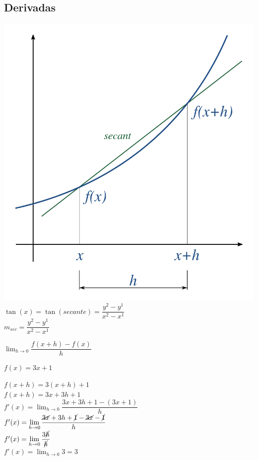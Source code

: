 \documentclass[stu, 12pt, letterpaper, donotrepeattitle, floatsintext, natbib]{apa7}
\begin{document}
    \subsection{Derivadas}\label{subsec:derivadas}
    \begin{paracol}{2}
        \includegraphics[scale=0.2]{derivative}
        \switchcolumn
        $\tan(x) = \tan({secante}) = \dfrac{y^2-y^1}{x^2-x^1}$\\[0.5cm]
        $m_{sec} = \dfrac{y^2-y^1}{x^2-x^1}$
    \end{paracol}

    $\displaystyle\lim_{h \to 0} \dfrac{f(x+h)-f(x)}{h} $\\[0.5cm]
    \begin{center}
        $f(x)=3x+1$\\[0.5cm]
    \end{center}
    \begin{paracol}{2}
        $f(x+h)=3(x+h)+1$\\[0.5cm]
        $f(x+h)=3x+3h+1$\\[0.5cm]
        \switchcolumn
        $f'(x)=\displaystyle\lim_{h\to0} \dfrac{3x+3h+1-(3x+1)}{h}$\\[0.5cm]
        $f'(x)=\displaystyle\lim_{h\to0} \dfrac{\cancel{3x}+3h+\cancel{1}-\cancel{3x}-\cancel{1}}{h}$\\[0.5cm]
        $f'(x)=\displaystyle\lim_{h\to0} \dfrac{3\cancel{h}}{\cancel{h}}$\\[0.5cm]
        $f'(x)=\displaystyle\lim_{h\to0} 3 = 3$\\[0.5cm]
    \end{paracol}
\end{document}
